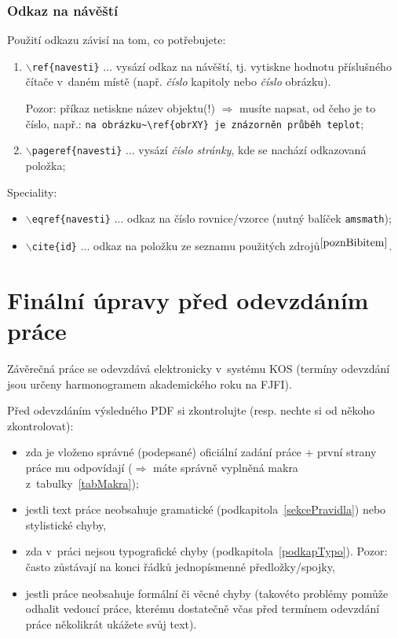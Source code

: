 \subsubsection{Odkaz na návěští}
Použití odkazu závisí na tom, co potřebujete:
\begin{enumerate}
\item {\tt $\backslash$ref\{navesti\}} ... vysází odkaz na návěští, tj. vytiskne hodnotu příslušného čítače v~daném místě (např. {\em číslo} kapitoly nebo {\em číslo} obrázku).\par 
Pozor: příkaz netiskne název objektu(!) $\Rightarrow$ musíte napsat, od čeho je to číslo, např.: {\tt na {\color{red}obrázku}\textasciitilde \textbackslash ref\{obrXY\} je znázorněn průběh teplot};
%
\item {\tt$\backslash$pageref\{navesti\}} ... vysází \textit{číslo stránky}, kde se nachází odkazovaná položka;
\end{enumerate}
Speciality:
\begin{itemize}
\item {\tt $\backslash$eqref\{navesti\}} ... odkaz na číslo rovnice/vzorce (nutný balíček {\tt amsmath}); %
\item {\tt $\backslash$cite\{id\}} ... odkaz na položku ze seznamu použitých zdrojů$^{\ref{poznBibitem}}$.
\end{itemize}


\section{Finální úpravy před odevzdáním práce}

Závěrečná práce se odevzdává elektronicky v~systému KOS (termíny odevzdání jsou určeny harmonogramem akademického roku na FJFI).
\par
Před odevzdáním výsledného PDF si zkontrolujte (resp. nechte si od někoho zkontrolovat):
\begin{itemize}
\item zda je vloženo správné (podepsané) oficiální zadání práce + první strany práce mu odpovídají  ($\Rightarrow$ máte správně vyplněná makra z~tabulky~\ref{tabMakra});
\item jestli text práce neobsahuje gramatické (podkapitola~\ref{sekcePravidla}) nebo stylistické chyby,
\item zda v~práci nejsou typografické chyby (podkapitola~\ref{podkapTypo}). Pozor: často zůstávají na konci řádků jednopísmenné předložky/spojky,
\item jestli práce neobsahuje formální či věcné chyby (takovéto problémy pomůže odhalit vedoucí práce, kterému {\color{red} dostatečně včas\/} před termínem odevzdání práce {\color{red} několikrát} ukážete svůj text).
\end{itemize}




